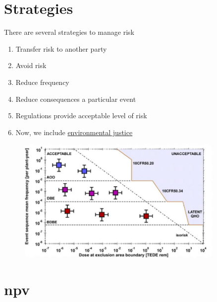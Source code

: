 \documentclass[aspectratio=1610,pdftex,dvipsnames,compress,xcolor={dvipsnames}]{beamer}
\newcommand{\acf}{\acrfull} %
\begin{document}
\section{Strategies}


\addtocounter{framenumber}{-1}
\begin{frame}{There are several strategies to manage risk}
    \begin{enumerate}[series=outerlist,topsep=0pt,itemsep=21pt,leftmargin=*,label=(\arabic*)]
        \item[]Transfer risk to another party
        \item[]Avoid risk
        \item[]Reduce frequency 
        \item[]Reduce consequences a particular event
        \item[]Regulations provide acceptable level of risk
        \item[]Now, we include \href{https://www.epa.gov/environmentaljustice}{environmental justice}
    \end{enumerate}
\end{frame}


\begin{frame}{}
    \begin{figure}
        \centering
        \includegraphics[width=0.90\textwidth]{farmer.jpg}
    \end{figure}
\end{frame}


\section{\acf{npv}}
\end{document}
